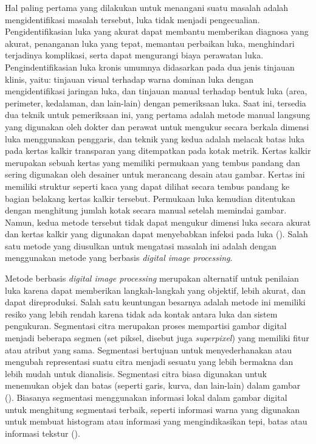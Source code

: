 Hal paling pertama yang dilakukan untuk menangani suatu 
masalah adalah mengidentifikasi masalah tersebut, luka 
tidak menjadi pengecualian. Pengidentifikasian luka yang 
akurat dapat membantu memberikan diagnosa yang akurat, 
penanganan luka yang tepat, memantau perbaikan luka, 
menghindari terjadinya komplikasi, serta dapat mengurangi 
biaya perawatan luka. Pengindentifikasian luka kronis 
umumnya didasarkan pada dua jenis tinjauan klinis, yaitu: 
tinjauan visual terhadap warna dominan luka dengan 
mengidentifikasi jaringan luka, dan tinjauan manual 
terhadap bentuk luka (area, perimeter, kedalaman, dan 
lain-lain) dengan pemeriksaan luka. Saat ini, tersedia 
dua teknik untuk pemeriksaan ini, yang pertama adalah 
metode manual langsung yang digunakan oleh dokter dan 
perawat untuk mengukur secara berkala dimensi luka 
menggunakan penggaris, dan teknik yang kedua adalah melacak 
batas luka pada kertas kalkir transparan yang ditempatkan 
pada kotak metrik. Kertas kalkir merupakan sebuah kertas 
yang memiliki permukaan yang tembus pandang dan sering 
digunakan oleh desainer untuk merancang desain atau gambar. 
Kertas ini memiliki struktur seperti kaca yang dapat 
dilihat secara tembus pandang ke bagian belakang kertas 
kalkir tersebut. Permukaan luka kemudian ditentukan dengan 
menghitung jumlah kotak secara manual setelah memindai 
gambar. Namun, kedua metode tersebut tidak dapat mengukur 
dimensi luka secara akurat dan kertas kalkir yang digunakan 
dapat menyebabkan infeksi pada luka (\cite{GuptaRTWS}). Salah 
satu metode yang diusulkan untuk mengatasi masalah ini 
adalah dengan menggunakan metode yang berbasis 
\textit{digital image processing}.

Metode berbasis \textit{digital image processing} merupakan 
alternatif untuk penilaian luka karena dapat memberikan 
langkah-langkah yang objektif, lebih akurat, dan dapat 
direproduksi. Salah satu keuntungan besarnya adalah metode 
ini memiliki resiko yang lebih rendah karena tidak ada kontak antara 
luka dan sistem pengukuran. Segmentasi citra merupakan 
proses mempartisi gambar digital menjadi beberapa segmen 
(set piksel, disebut juga \textit{superpixel}) yang 
memiliki fitur atau atribut yang sama. Segmentasi bertujuan 
untuk menyederhanakan atau mengubah representasi suatu 
citra menjadi sesuatu yang lebih bermakna dan lebih mudah 
untuk dianalisis. Segmentasi citra biasa digunakan untuk 
menemukan objek dan batas (seperti garis, kurva, dan 
lain-lain) dalam gambar (\cite{ShmmalaCBI}). Biasanya 
segmentasi menggunakan informasi lokal dalam gambar digital 
untuk menghitung segmentasi terbaik, seperti informasi 
warna yang digunakan untuk membuat histogram atau informasi 
yang mengindikasikan tepi, batas atau informasi tekstur 
(\cite{khattab}).

